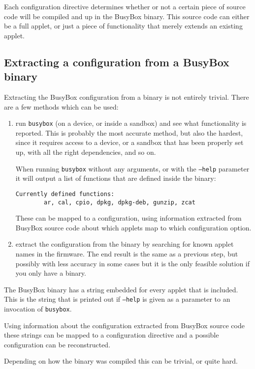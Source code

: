 \documentclass[10pt]{article}
\begin{document}
Each configuration directive determines whether or not a certain piece of
source code will be compiled and up in the BusyBox binary. This source code can
either be a full applet, or just a piece of functionality that merely extends
an existing applet.

\subsection{Extracting a configuration from a BusyBox binary}

Extracting the BusyBox configuration from a binary is not entirely trivial.
There are a few methods which can be used:

\begin{enumerate}
\item run \texttt{busybox} (on a device, or inside a sandbox) and see what
functionality is reported. This is probably the most accurate method, but also
the hardest, since it requires access to a device, or a sandbox that has been
properly set up, with all the right dependencies, and so on.

When running \texttt{busybox} without any arguments, or with the \texttt{--help}
parameter it will output a list of functions that are defined inside the
binary:

\begin{verbatim}
Currently defined functions:
        ar, cal, cpio, dpkg, dpkg-deb, gunzip, zcat
\end{verbatim}

These can be mapped to a configuration, using information extracted from
BusyBox source code about which applets map to which configuration option.
\item extract the configuration from the binary by searching for known applet
names in the firmware. The end result is the same as a previous step, but
possibly with less accuracy in some cases but it is the only feasible solution
if you only have a binary.
\end{enumerate}

The BusyBox binary has a string embedded for every applet that is included.
This is the string that is printed out if \texttt{--help} is given as a
parameter to an invocation of \texttt{busybox}.

Using information about the configuration extracted from BusyBox source code
these strings can be mapped to a configuration directive and a possible
configuration can be reconstructed.

Depending on how the binary was compiled this can be trivial, or quite hard.
\end{document}
